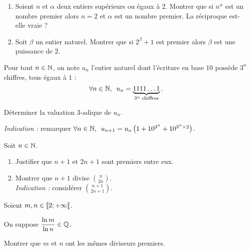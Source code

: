 \begin{exo}
\begin{enumerate}
\item Soient \(n\) et \(\alpha\) deux entiers supérieurs ou égaux à \(2\). Montrer que si \(n^\alpha\) est un nombre premier alors \(n=2\) et \(\alpha\) est un nombre premier. La réciproque est-elle vraie ? \\

\item Soit \(\beta\) un entier naturel. Montrer que si \(2^\beta+1\) est premier alors \(\beta\) est une puissance de \(2\).
\end{enumerate}
\end{exo}

\begin{corr}
\end{corr}

\begin{exo}
Pour tout \(n\in\mathbb{N}\), on note \(u_n\) l'entier naturel dont l'écriture en base \(10\) possède \(3^n\) chiffres, tous égaux à \(1\) : \[\quantifs{\forall n\in\N}u_n=\underbrace{1111\dots1}_{3^n\text{ chiffres}}.\]

Déterminer la valuation \(3\)-adique de \(u_n\).

\textit{Indication :} remarquer \(\quantifs{\forall n\in\N}u_{n+1}=u_n\paren{1+10^{3^n}+10^{3^n\times2}}\).
\end{exo}

\begin{corr}
\end{corr}

\begin{exo}
Soit \(n\in\mathbb{N}\).

\begin{enumerate}
\item Justifier que \(n+1\) et \(2n+1\) sont premiers entre eux. \\

\item Montrer que \(n+1\) divise \(\binom{n}{2n}\). \\

\textit{Indication :} considérer \(\binom{n+1}{2n+1}\).
\end{enumerate}
\end{exo}

\begin{corr}
\end{corr}

\begin{exo}
Soient \(m,n\in\left\llbracket2;+\infty\right\llbracket\).

On suppose \(\dfrac{\ln m}{\ln n}\in\mathbb{Q}\).

Montrer que \(m\) et \(n\) ont les mêmes diviseurs premiers.
\end{exo}

